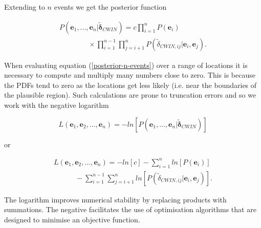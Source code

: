 \documentclass[12pt,double]{article}
\begin{document}
Extending to $n$ events we get the posterior function
\begin{linenomath*} \begin{equation}
\begin{array}{l}
\label{posterior-n-events}
P(\mathbf{e}_1,...,\mathbf{e}_n | \widetilde{\mathbf{\delta}}_{CWIN}) = c \displaystyle \prod_{i=1}^n P(\mathbf{e}_i) \\
\hspace{4em} \displaystyle  \times \prod_{i=1}^{n-1} \prod_{j=i+1}^n P(\widetilde{\delta}_{CWIN,ij}|\mathbf{e}_i,\mathbf{e}_j).
\end{array}
\end{equation} \end{linenomath*}
When evaluating equation (\ref{posterior-n-events})
over a range of locations it is necessary to compute and multiply
many numbers close to zero. This is because the PDFs tend to zero as
the locations get less likely (i.e. near the boundaries of the
plausible region). Such calculations are prone to truncation errors
and so we work with the negative logarithm
\begin{linenomath*} \begin{equation}
\label{eq:-negative-log-part1}
L(\mathbf{e}_1, \mathbf{e}_2, ..., \mathbf{e}_n) = -ln\left[ P(\mathbf{e}_1,...,\mathbf{e}_n | \widetilde{\mathbf{\delta}}_{CWIN} )  \right]
\end{equation} \end{linenomath*}
or
\begin{linenomath*} \begin{equation}
\begin{array}{l}
\label{eq:-negative-log}
L(\mathbf{e}_1, \mathbf{e}_2, ..., \mathbf{e}_n) =
-ln\left[ c \right] - \displaystyle \sum_{i=1}^n ln\left[P(\mathbf{e}_i)\right] \\
\hspace{3em} - \displaystyle \sum_{i=1}^{n-1} \sum_{j=i+1}^n ln\left[P(\widetilde{\delta}_{CWIN,ij}|\mathbf{e}_i,\mathbf{e}_j)\right].
\end{array}
\end{equation} \end{linenomath*}
The logarithm improves numerical stability by replacing products
with summations. The negative facilitates the use of optimisation
algorithms that are designed to minimise an objective function.
\end{document}
